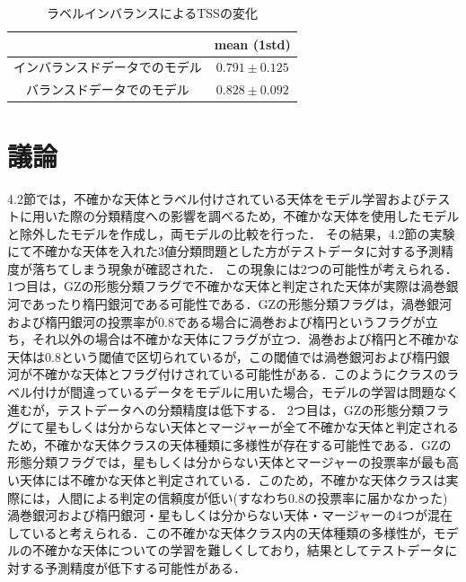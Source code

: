 \documentclass[a4j, 11pt]{jreport}
\begin{document}

\begin{table}[H]
  \centering
	\caption{ラベルインバランスによるTSSの変化}
  \begin{tabular}{|c|c|}
		\hline
    & mean (1std) \\ \hline
    インバランスドデータでのモデル & $0.791 \pm 0.125$ \\ \hline
    バランスドデータでのモデル & $0.828 \pm 0.092$ \\ \hline
  \end{tabular}
  \label{tb:TSS_4.3}
\end{table}

\newpage
\section{議論}
4.2節では，不確かな天体とラベル付けされている天体をモデル学習およびテストに用いた際の分類精度への影響を調べるため，不確かな天体を使用したモデルと除外したモデルを作成し，両モデルの比較を行った．
その結果，4.2節の実験にて不確かな天体を入れた3値分類問題とした方がテストデータに対する予測精度が落ちてしまう現象が確認された．
この現象には2つの可能性が考えられる．1つ目は，GZの形態分類フラグで不確かな天体と判定された天体が実際は渦巻銀河であったり楕円銀河である可能性である．GZの形態分類フラグは，渦巻銀河および楕円銀河の投票率が0.8である場合に渦巻および楕円というフラグが立ち，それ以外の場合は不確かな天体にフラグが立つ．渦巻および楕円と不確かな天体は0.8という閾値で区切られているが，この閾値では渦巻銀河および楕円銀河が不確かな天体とフラグ付けされている可能性がある．このようにクラスのラベル付けが間違っているデータをモデルに用いた場合，モデルの学習は問題なく進むが，テストデータへの分類精度は低下する．
2つ目は，GZの形態分類フラグにて星もしくは分からない天体とマージャーが全て不確かな天体と判定されるため，不確かな天体クラスの天体種類に多様性が存在する可能性である．GZの形態分類フラグでは，星もしくは分からない天体とマージャーの投票率が最も高い天体には不確かな天体と判定されている．このため，不確かな天体クラスは実際には，人間による判定の信頼度が低い(すなわち0.8の投票率に届かなかった)渦巻銀河および楕円銀河・星もしくは分からない天体・マージャーの4つが混在していると考えられる．この不確かな天体クラス内の天体種類の多様性が，モデルの不確かな天体についての学習を難しくしており，結果としてテストデータに対する予測精度が低下する可能性がある．
\end{document}
